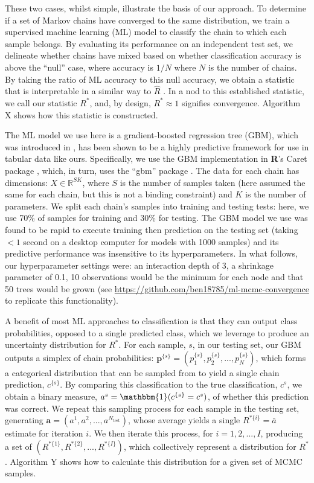 \documentclass{article}
\begin{document}
These two cases, whilst simple, illustrate the basis of our approach. To determine if a set of Markov chains have converged to the same distribution, we train a supervised machine learning (ML) model to classify the chain to which each sample belongs. By evaluating its performance on an independent test set, we delineate whether chains have mixed based on whether classification accuracy is above the ``null'' case, where accuracy is $1/{N}$ where $N$ is the number of chains. By taking the ratio of ML accuracy to this null accuracy, we obtain a statistic that is interpretable in a similar way to $\hat{R}$ \cite{gelman2013bayesian}. In a nod to this established statistic, we call our statistic $R^*$, and, by design, $R^*\approx 1$ signifies convergence. Algorithm X shows how this statistic is constructed.

The ML model we use here is a gradient-boosted regression tree (GBM), which was introduced in \cite{friedman2001greedy}, has been shown to be a highly predictive framework for use in tabular data \cite{chollet2018} like ours. Specifically, we use the GBM implementation in \textbf{\textsf{R}}'s Caret package \cite{kuhn2008building}, which, in turn, uses the ``gbm'' package \cite{greenwell2019package}. The data for each chain has dimensions: $X\in \mathbb{R}^{SK}$, where $S$ is the number of samples taken (here assumed the same for each chain, but this is not a binding constraint) and $K$ is the number of parameters. We split each chain's samples into training and testing tests: here, we use 70\% of samples for training and 30\% for testing. The GBM model we use was found to be rapid to execute training then prediction on the testing set (taking $<1$ second on a desktop computer for models with 1000 samples) and its predictive performance was insensitive to its hyperparameters. In what follows, our hyperparameter settings were: an interaction depth of 3, a shrinkage parameter of 0.1, 10 observations would be the minimum for each node and that 50 trees would be grown (see \url{https://github.com/ben18785/ml-mcmc-convergence} to replicate this functionality).

A benefit of most ML approaches to classification is that they can output class probabilities, opposed to a single predicted class, which we leverage to produce an uncertainty distribution for $R^*$. For each sample, $s$, in our testing set, our GBM outputs a simplex of chain probabilities: $\boldsymbol{p}^{\{s\}}=(p_1^{\{s\}},p_2^{\{s\}},...,p_N^{\{s\}})$, which forms a categorical distribution that can be sampled from to yield a single chain prediction, $c^{\{s\}}$. By comparing this classification to the true classification, $c^s$, we obtain a binary measure, $a^s=\mathbbm{1}(c^{\{s\}}=c^s)$, of whether this prediction was correct. We repeat this sampling process for each sample in the testing set, generating $\boldsymbol{a}=(a^1,a^2,...,a^{N_\text{test}})$, whose average yields a single $R^{*\{i\}}=\bar{a}$ estimate for iteration $i$. We then iterate this process, for $i=1,2,...,I$, producing a set of $(R^{*\{1\}},R^{*\{2\}},...,R^{*\{I\}})$, which collectively represent a distribution for $R^*$. Algorithm Y shows how to calculate this distribution for a given set of MCMC samples.
\end{document}
